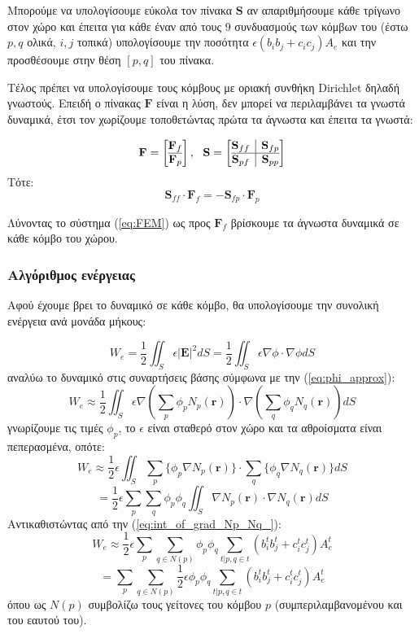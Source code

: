 \documentclass[10pt, letterpaper]{article}
\newcommand{\en}{\selectlanguage{english}}
\newcommand{\gr}{\selectlanguage{greek}}
\begin{document}
Μπορούμε να υπολογίσουμε εύκολα τον πίνακα $\mathbf{S}$ αν απαριθμήσουμε κάθε τρίγωνο στον χώρο και έπειτα για κάθε έναν από τους
9 συνδυασμούς των κόμβων του (έστω $p,q$ ολικά, $i,j$ τοπικά) υπολογίσουμε την ποσότητα $\epsilon (b_ib_j + c_ic_j) A_e$ και την προσθέσουμε στην θέση $[p,q]$ του πίνακα.

Τέλος πρέπει να υπολογίσουμε τους κόμβους με οριακή συνθήκη \en Dirichlet \gr δηλαδή γνωστούς. Επειδή ο πίνακας $\mathbf{F}$ είναι η λύση,
δεν μπορεί να περιλαμβάνει τα γνωστά δυναμικά, έτσι τον χωρίζουμε τοποθετώντας πρώτα τα άγνωστα και έπειτα τα γνωστά:

\[
\mathbf{F} = 
\left[ \begin{array}{@{}c@{}}
\mathbf{F}_f \\
\hline
\mathbf{F}_p
\end{array} \right]
, \ \
\mathbf{S} = 
\left[ \begin{array}{@{}c|c@{}}
  \mathbf{S}_{ff} & \mathbf{S}_{fp} \\
  \hline
  \mathbf{S}_{pf} & \mathbf{S}_{pp}
  \end{array} \right]
\]
Τότε:
\begin{equation}   \label{eq:FEM}
  \mathbf{S}_{ff} \cdot \mathbf{F}_f = - \mathbf{S}_{fp} \cdot \mathbf{F}_p
\end{equation}

Λύνοντας το σύστημα (\ref{eq:FEM}) ως προς $\mathbf{F}_f$ βρίσκουμε τα άγνωστα δυναμικά σε κάθε κόμβο του χώρου.




\subsubsection*{Αλγόριθμος ενέργειας}

Αφού έχουμε βρει το δυναμικό σε κάθε κόμβο, θα υπολογίσουμε την συνολική ενέργεια ανά μονάδα μήκους:


\[W_e = \frac{1}{2} \iint_S \epsilon |\mathbf{E}|^2dS = \frac{1}{2} \iint_S \epsilon \nabla \phi  \cdot \nabla \phi dS\]
αναλύω το δυναμικό στις συναρτήσεις βάσης σύμφωνα με την (\ref{eq:phi_approx}):
\[W_e \approx \frac{1}{2} \iint_S \epsilon \nabla (\sum_p \phi_p N_p(\mathbf{r}))  \cdot \nabla (\sum_q \phi_q N_q(\mathbf{r})) dS\]
γνωρίζουμε τις τιμές $\phi_p$, το $\epsilon$ είναι σταθερό στον χώρο και τα αθροίσματα είναι πεπερασμένα, οπότε:
\[ W_e \approx  \frac{1}{2} \epsilon \iint_S  \sum_p \{ \phi_p \nabla N_p(\mathbf{r}) \} \cdot  \sum_q \{ \phi_q \nabla N_q(\mathbf{r}) \} dS\]
\[ = \frac{1}{2} \epsilon  \sum_p \sum_q  \phi_p \phi_q \iint_S \nabla N_p(\mathbf{r})  \cdot \nabla N_q(\mathbf{r})  dS \]
Αντικαθιστώντας από την (\ref{eq:int_of_grad_Np_Nq_}):
\[ W_e \approx \frac{1}{2} \epsilon  \sum_p \sum_{q \in N(p)}  \phi_p \phi_q   \sum_{t | p,q \in t} (b_i^tb_j^t + c_i^tc_j^t) A_e^t  \]
\[ =   \sum_p \sum_{q \in N(p)} \frac{1}{2} \epsilon  \phi_p \phi_q   \sum_{t | p,q \in t} (b_i^tb_j^t + c_i^tc_j^t) A_e^t   \]
όπου ως $N(p)$ συμβολίζω τους γείτονες του κόμβου $p$ (συμπεριλαμβανομένου και του εαυτού του).
\end{document}
